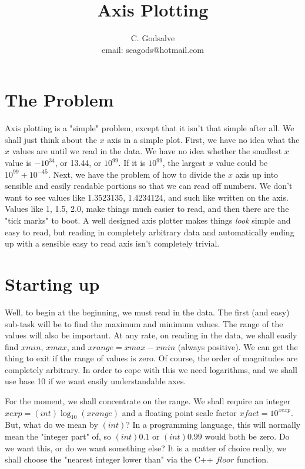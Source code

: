 \documentclass[12pt]{article}
\begin{document}

\thispagestyle{empty}


\title{Axis Plotting}

\author{C. Godsalve \\
   email: seagods@hotmail.com}

\maketitle

\tableofcontents


\section{The Problem}

Axis plotting is a "simple" problem, except that it isn't that simple after all.
We shall just think about the $x$ axis in a simple plot. First, we have no idea
what the $x$ values are until we read in the data. We have no idea whether the
smallest $x$ value is $-10^{34}$, or 13.44, or $10^{99}$. If it is $10^{99}$, the 
largest $x$ value could be $10^{99}+10^{-45}$. Next, we have the problem of how
to divide the $x$ axis up into sensible and easily readable portions so that we 
can read off numbers. We don't want to see values like 1.3523135, 1.4234124, and
such like written on the axis.  Values like 1, 1.5, 2.0, make things much easier 
to read, and then there are the "tick marks" to boot. A well designed axis plotter
makes things {\it look} simple and easy to read, but reading in completely
arbitrary data and automatically ending up with a sensible easy to read axis
isn't completely trivial.

\section{Starting up}

Well, to begin at the beginning, we must read in the data. The first (and easy) sub-task
will be to find the maximum and minimum values. The range of the values will also
be important. At any rate, on reading in the data, we shall easily find $xmin$, $xmax$,
 and $xrange=xmax-xmin$ (always positive). We can get the thing 
to exit if the range of values is zero.
Of course, the order of magnitudes are completely arbitrary. In order to cope with this
we need logarithms, and we shall use base 10 if we want easily understandable axes.

For the moment, we shall concentrate on the range. We shall require an integer
 $xexp=(int)\log_{10}(xrange)$ and a floating point scale factor $xfact=10^{xexp}$.
But, what do we mean by $(int)$? In a programming language, this will normally mean
the "integer part" of, so $(int)0.1$ or $(int)0.99$ would both be zero. Do we
want this, or do we want  something else? 
It is a matter of choice really, we shall choose 
the "nearest integer lower than" via the C++ $floor$ function.
\end{document}

